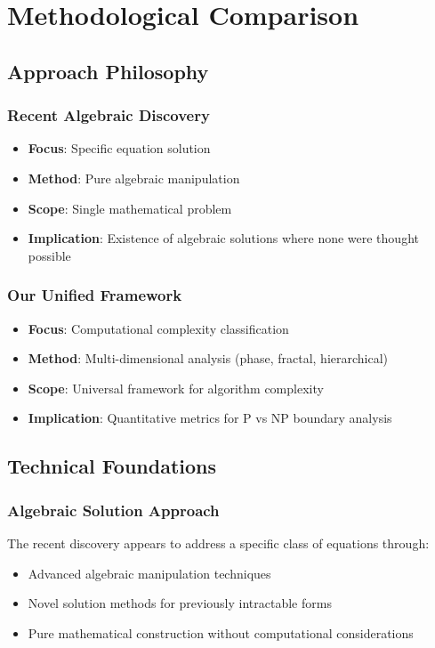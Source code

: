 \documentclass[12pt]{article}
\begin{document}
\section{Methodological Comparison}

\subsection{Approach Philosophy}

\subsubsection{Recent Algebraic Discovery}
\begin{itemize}
    \item \textbf{Focus}: Specific equation solution
    \item \textbf{Method}: Pure algebraic manipulation
    \item \textbf{Scope}: Single mathematical problem
    \item \textbf{Implication}: Existence of algebraic solutions where none were thought possible
\end{itemize}

\subsubsection{Our Unified Framework}
\begin{itemize}
    \item \textbf{Focus}: Computational complexity classification
    \item \textbf{Method}: Multi-dimensional analysis (phase, fractal, hierarchical)
    \item \textbf{Scope}: Universal framework for algorithm complexity
    \item \textbf{Implication}: Quantitative metrics for P vs NP boundary analysis
\end{itemize}

\subsection{Technical Foundations}

\subsubsection{Algebraic Solution Approach}
The recent discovery appears to address a specific class of equations through:
\begin{itemize}
    \item Advanced algebraic manipulation techniques
    \item Novel solution methods for previously intractable forms
    \item Pure mathematical construction without computational considerations
\end{itemize}
\end{document}

